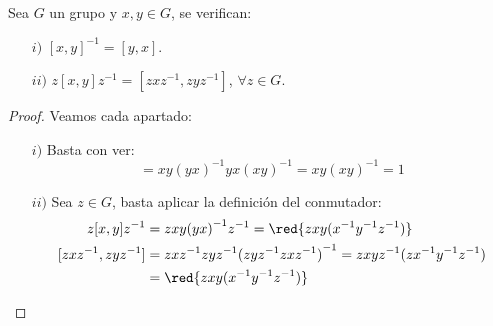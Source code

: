 \begin{prop}\label{prop:props_conmutador}
    Sea $G$ un grupo y $x,y\in G$, se verifican:
    \begin{itemize}
        \item[$i)$] ${[x,y]}^{-1} = [y,x]$.
        \item[$ii)$] $z[x,y]z^{-1} = [zxz^{-1}, zyz^{-1}]$, $\forall z\in G$.
    \end{itemize}
    \begin{proof}
        Veamos cada apartado:
        \begin{enumerate}
            \item[$i)$] Basta con ver:
                \begin{equation*}
                    [x,y][y,x] = xy{(yx)}^{-1}yx{(xy)}^{-1} = xy{(xy)}^{-1} = 1
                \end{equation*}
            \item[$ii)$] Sea $z\in G$, basta aplicar la definición del conmutador:
                \begin{align*}
                    z[x,y]z^{-1} &= zxy{(yx)}^{-1}z^{-1} = \red{zxy(x^{-1}y^{-1}z^{-1})}  \\
                    [zxz^{-1}, zyz^{-1}] &= zxz^{-1}zyz^{-1} {(zyz^{-1}zxz^{-1})}^{-1} = zxyz^{-1}(zx^{-1}y^{-1}z^{-1}) \\ &= \red{zxy (x^{-1}y^{-1}z^{-1})}
                \end{align*} \qedhere
        \end{enumerate}
    \end{proof}
\end{prop}

